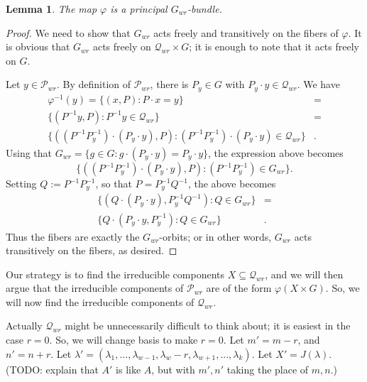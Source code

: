 \documentclass[12pt,psamsfonts]{article}
\newtheorem{lemma}[theorem]{Lemma}
\begin{document}
\begin{lemma}\label{principal_bundle}
    The map \(\varphi\) is a principal \(G_{wr}\)-bundle.
\end{lemma}
\begin{proof}
    We need to show that \(G_{wr}\) acts freely and transitively on the fibers of \(\varphi\).
    It is obvious that \(G_{wr}\) acts freely on \(\mathcal{Q}_{wr} \times G\); it is enough to note that it acts freely on \(G\).
    \par Let \(y \in \mathcal{P}_{wr}\).
    By definition of \(\mathcal{P}_{wr}\), there is \(P_y \in G\) with \(P_y \cdot y \in \mathcal{Q}_{wr}\).
    We have
    \begin{align*}
        \varphi^{-1}(y) = \{(x, P) : P \cdot x = y \} & = \\
        \{(P^{-1} y, P) : P^{-1} y \in \mathcal{Q}_{wr} \} & = \\
        \{((P^{-1}P_y^{-1}) \cdot (P_y \cdot y), P) : (P^{-1} P_y^{-1}) \cdot (P_y \cdot y) \in \mathcal{Q}_{wr}\} & .
    \end{align*}
    Using that \(G_{wr} = \{g \in G : g \cdot (P_y \cdot y) = P_y \cdot y\}\), the expression above becomes
    \[\{((P^{-1}P_y^{-1}) \cdot (P_y \cdot y), P) : (P^{-1} P_y^{-1}) \in G_{wr}\}.\]
    Setting \(Q := P^{-1} P_y^{-1}\), so that \(P = P_y^{-1} Q^{-1}\), the above becomes
    \begin{align*}
        \{(Q \cdot (P_y \cdot y), P_y^{-1} Q^{-1}) : Q \in G_{wr}\} & = \\
        \{Q \cdot (P_y \cdot y, P_y^{-1}) : Q \in G_{wr}\} & .
    \end{align*}
    Thus the fibers are exactly the \(G_{wr}\)-orbits; or in other words, \(G_{wr}\) acts transitively on the fibers, as desired.
\end{proof}
Our strategy is to find the irreducible components \(X \subseteq \mathcal{Q}_{wr}\), and we will then argue that the irreducible components of \(\mathcal{P}_{wr}\) are of the form \(\varphi(X \times G)\).
So, we will now find the irreducible components of \(\mathcal{Q}_{wr}\).
\par Actually \(\mathcal{Q}_{wr}\) might be unnecessarily difficult to think about; it is easiest in the case \(r = 0\).
So, we will change basis to make \(r = 0\).
Let \(m' = m - r\), and \(n' = n + r\).
Let \(\lambda' = (\lambda_1, ..., \lambda_{w - 1}, \lambda_w - r, \lambda_{w + 1}, ..., \lambda_k)\).
Let \(X' = J(\lambda)\).
(TODO: explain that \(A'\) is like \(A\), but with \(m',n'\) taking the place of \(m,n\).)
\end{document}
